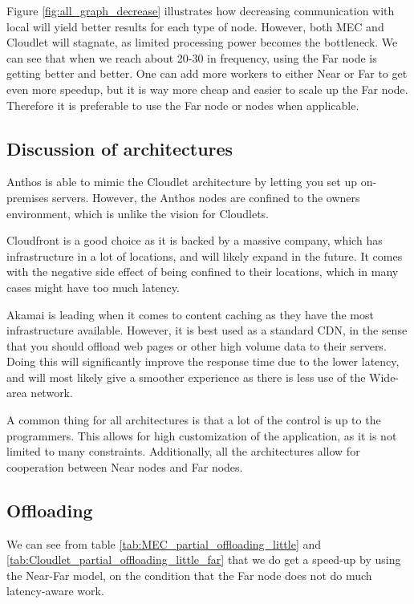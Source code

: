 Figure \ref{fig:all_graph_decrease} illustrates how decreasing communication with local will yield better results for each type of node. However, both MEC and Cloudlet will stagnate, as limited processing power becomes the bottleneck. We can see that when we reach about 20-30 in frequency, using the Far node is getting better and better. One can add more workers to either Near or Far to get even more speedup, but it is way more cheap and easier to scale up the Far node. Therefore it is preferable to use the Far node or nodes when applicable.





\subsection{Discussion of architectures}
Anthos is able to mimic the Cloudlet architecture by letting you set up on-premises servers. However, the Anthos nodes are confined to the owners environment, which is unlike the vision for Cloudlets. 

Cloudfront is a good choice as it is backed by a massive company, which has infrastructure in a lot of locations, and will likely expand in the future. It comes with the negative side effect of being confined to their locations, which in many cases might have too much latency.

Akamai is leading when it comes to content caching as they have the most infrastructure available. However, it is best used as a standard CDN, in the sense that you should offload web pages or other high volume data to their servers. Doing this will significantly improve the response time due to the lower latency, and will most likely give a smoother experience as there is less use of the Wide-area network.

A common thing for all architectures is that a lot of the control is up to the programmers. This allows for high customization of the application, as it is not limited to many constraints. Additionally, all the architectures allow for cooperation between Near nodes and Far nodes. 


\subsection{Offloading}
We can see from table \ref{tab:MEC_partial_offloading_little} and \ref{tab:Cloudlet_partial_offloading_little_far} that we do get a speed-up by using the Near-Far model, on the condition that the Far node does not do much latency-aware work. 

